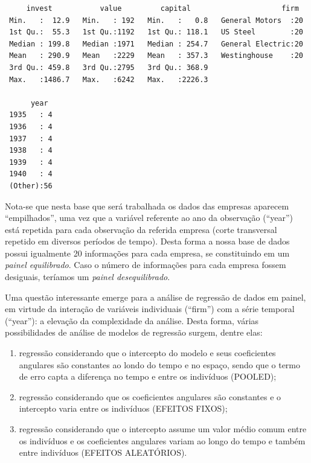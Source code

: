 \documentclass[12pt,brazil,oneside]{book}
\begin{document}
\begin{verbatim}
     invest           value         capital                     firm   
 Min.   :  12.9   Min.   : 192   Min.   :   0.8   General Motors  :20  
 1st Qu.:  55.3   1st Qu.:1192   1st Qu.: 118.1   US Steel        :20  
 Median : 199.8   Median :1971   Median : 254.7   General Electric:20  
 Mean   : 290.9   Mean   :2229   Mean   : 357.3   Westinghouse    :20  
 3rd Qu.: 459.8   3rd Qu.:2795   3rd Qu.: 368.9                        
 Max.   :1486.7   Max.   :6242   Max.   :2226.3                        
                                                                       
      year   
 1935   : 4  
 1936   : 4  
 1937   : 4  
 1938   : 4  
 1939   : 4  
 1940   : 4  
 (Other):56  
\end{verbatim}

Nota-se que nesta base que será trabalhada os dados das empresas aparecem ``empilhados'', uma vez que a variável referente ao ano da observação (``year'') está repetida para cada observação da referida empresa (corte transversal repetido em diversos períodos de tempo). Desta forma a nossa base de dados possui igualmente 20 informações para cada empresa, se constituindo em um \emph{painel equilibrado}. Caso o número de informações para cada empresa fossem desiguais, teríamos um \emph{painel desequilibrado}.

Uma questão interessante emerge para a análise de regressão de dados em painel, em virtude da interação de variáveis individuais (``firm'') com a série temporal (``year''): a elevação da complexidade da análise. Desta forma, várias possibilidades de análise de modelos de regressão surgem, dentre elas:

\begin{enumerate}
\def\labelenumi{\alph{enumi})}
\item
  regressão considerando que o intercepto do modelo e seus coeficientes angulares são constantes ao londo do tempo e no espaço, sendo que o termo de erro capta a diferença no tempo e entre os indivíduos (POOLED);
\item
  regressão considerando que os coeficientes angulares são constantes e o intercepto varia entre os indivíduos (EFEITOS FIXOS);
\item
  regressão considerando que o intercepto assume um valor médio comum entre os indivíduos e os coeficientes angulares variam ao longo do tempo e também entre indivíduos (EFEITOS ALEATÓRIOS).
\end{enumerate}
\end{document}
